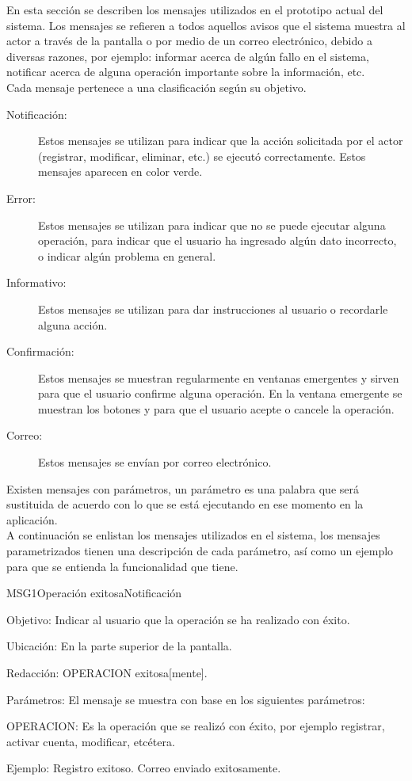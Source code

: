 
	En esta sección se describen los mensajes utilizados en el prototipo actual del sistema. Los mensajes se refieren a todos aquellos avisos que el sistema muestra al actor a través de la pantalla o por medio de un correo electrónico, debido a diversas razones, por ejemplo: informar acerca de algún fallo en el sistema, notificar acerca de alguna operación importante sobre la información, etc. \\		
	Cada mensaje pertenece a una clasificación según su objetivo.
	
\begin{description}
	\item[Notificación:] Estos mensajes se utilizan para indicar que la acción solicitada por el actor (registrar, modificar, eliminar, etc.) se ejecutó correctamente. 
	Estos mensajes aparecen en color verde.
	\item[Error:] Estos mensajes se utilizan para indicar que no se puede ejecutar alguna operación, para indicar que el usuario ha ingresado algún dato incorrecto, o indicar algún problema en general.
	\item[Informativo:] Estos mensajes se utilizan para dar instrucciones al usuario o recordarle alguna acción. 
	\item[Confirmación:] Estos mensajes se muestran regularmente en ventanas emergentes y sirven para que el usuario confirme alguna operación. En la ventana emergente se muestran los botones  y  para que el usuario acepte o cancele la operación.
	\item[Correo:] Estos mensajes se envían por correo electrónico.
\end{description}

    Existen mensajes con parámetros, un parámetro es una palabra que será sustituida de acuerdo con lo que se está ejecutando en ese momento en la aplicación.\\ 
    A continuación se enlistan los mensajes utilizados en el sistema, los mensajes parametrizados tienen una descripción de cada parámetro, así como un ejemplo para que se entienda la funcionalidad que tiene. \\

\begin{mensaje}{MSG1}{Operación exitosa}{Notificación}
	\item[Objetivo:] Indicar al usuario que la operación se ha realizado con éxito.
    \item[Ubicación:] En la parte superior de la pantalla.
	\item[Redacción:] OPERACION exitosa[mente]. 
	\item[Parámetros:] El mensaje se muestra con base en los siguientes parámetros:
	\begin{Citemize}
		\item OPERACION: Es la operación que se realizó con éxito, por ejemplo registrar, activar cuenta, modificar, etcétera.
	\end{Citemize}
	\item[Ejemplo:] Registro exitoso. Correo enviado exitosamente.
\end{mensaje}

